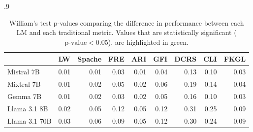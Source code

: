 \documentclass{article}
\begin{document}
\begin{table}[!htb]
    \begin{subtable}[t]{.9\textwidth}
        \centering \footnotesize
          \begin{tabular}{l|rrrrrrrr}
         & \multicolumn{1}{l}{LW} & \multicolumn{1}{l}{Spache} & \multicolumn{1}{l}{FRE} & \multicolumn{1}{l}{ARI} & \multicolumn{1}{l}{GFI} & \multicolumn{1}{l}{DCRS} & \multicolumn{1}{l}{CLI} & \multicolumn{1}{l}{FKGL} \\ \hline
        Mistral 7B & \cellcolor[HTML]{B7E1CD}0.01 & \cellcolor[HTML]{B7E1CD}0.01 & \cellcolor[HTML]{B7E1CD}0.03 & \cellcolor[HTML]{B7E1CD}0.01 & \cellcolor[HTML]{B7E1CD}0.04 & 0.13 & 0.10 & \cellcolor[HTML]{B7E1CD}0.03 \\
        Mixtral 7B & \cellcolor[HTML]{B7E1CD}0.01 & \cellcolor[HTML]{B7E1CD}0.02 & \cellcolor[HTML]{B7E1CD}0.05 & \cellcolor[HTML]{B7E1CD}0.02 & 0.06 & 0.19 & 0.14 & \cellcolor[HTML]{B7E1CD}0.04 \\
        Gemma 7B & \cellcolor[HTML]{B7E1CD}0.01 & \cellcolor[HTML]{B7E1CD}0.02 & \cellcolor[HTML]{B7E1CD}0.03 & \cellcolor[HTML]{B7E1CD}0.02 & \cellcolor[HTML]{B7E1CD}0.05 & 0.16 & 0.10 & \cellcolor[HTML]{B7E1CD}0.03 \\
        Llama 3.1 8B & \cellcolor[HTML]{B7E1CD}0.02 & 0.05 & 0.12 & \cellcolor[HTML]{B7E1CD}0.05 & 0.12 & 0.31 & 0.25 & 0.09 \\
        Llama 3.1 70B & \cellcolor[HTML]{B7E1CD}0.03 & 0.06 & 0.09 & \cellcolor[HTML]{B7E1CD}0.05 & 0.12 & 0.30 & 0.24 & 0.09 \\
        \end{tabular}
        \caption{Kendall-Tau p-values.}\label{subtab:kt-pval}
    \end{subtable} 
    \caption{William's test p-values comparing the difference in performance between each LM and each traditional metric. Values that are statistically significant ($\textrm{p-value} < 0.05$), are highlighted in green.}
    \label{tab:signigicance-testing}
\end{table}
\end{document}
